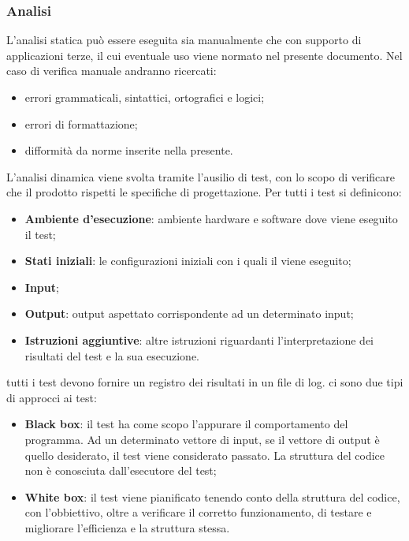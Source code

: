 	\subsubsection{Analisi}
	L'analisi statica può essere eseguita sia manualmente che con supporto di applicazioni terze, il cui eventuale uso viene normato nel presente documento. Nel caso di verifica manuale andranno ricercati:
	\begin{itemize}
	    \item errori grammaticali, sintattici, ortografici e logici;
	    \item errori di formattazione;
	    \item difformità da norme inserite nella presente.
	\end{itemize}
	L'analisi dinamica viene svolta tramite l'ausilio di test, con lo scopo di verificare che il prodotto rispetti le specifiche di progettazione.
	Per tutti i test si definicono:
	\begin{itemize}
	    \item \textbf{Ambiente d'esecuzione}: ambiente hardware e software dove viene eseguito il test;
	    \item \textbf{Stati iniziali}: le configurazioni iniziali con i quali il viene eseguito;
	    \item \textbf{Input};
	    \item \textbf{Output}: output aspettato corrispondente ad un determinato input;
	    \item \textbf{Istruzioni aggiuntive}: altre istruzioni riguardanti l'interpretazione dei risultati del test e la sua esecuzione.
	\end{itemize}
	tutti i test devono fornire un registro dei risultati in un file di log.
	ci sono due tipi di approcci ai test:
	\begin{itemize}
	    \item \textbf{Black box}: il test ha come scopo l'appurare il comportamento del programma. Ad un determinato vettore di input, se il vettore di output è quello desiderato, il test viene considerato passato. La struttura del codice non è conosciuta dall'esecutore del test; 
	    \item \textbf{White box}: il test viene pianificato tenendo conto della struttura del codice, con l'obbiettivo, oltre a verificare il corretto funzionamento, di testare e migliorare l'efficienza e la struttura stessa. 
	\end{itemize}
